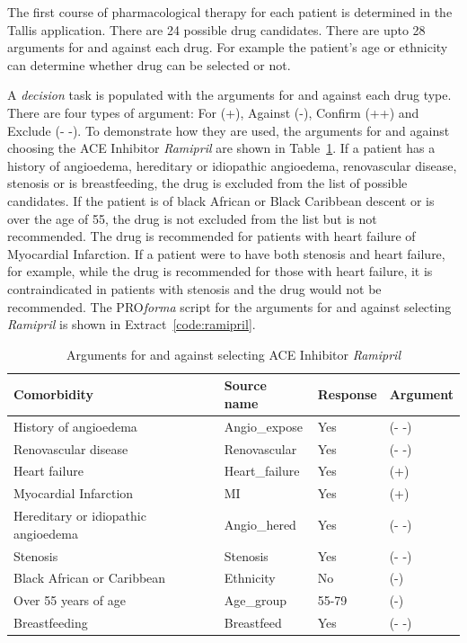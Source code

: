 \documentclass[11pt]{article}
\begin{document}
The first course of pharmacological therapy for each patient is determined in the Tallis application. There are 24 possible drug candidates. There are upto 28 arguments for and against each drug. For example the patient's age or ethnicity can determine whether drug can be selected or not.

A \textit{decision} task is populated with the arguments for and against each drug type. There are four types of argument: For (+), Against (-), Confirm (++) and Exclude (- -). To demonstrate how they are used, the arguments for and against choosing the ACE Inhibitor \textit{Ramipril} are shown in Table~\ref{table:ramipril}. If a patient has a history of angioedema, hereditary or idiopathic angioedema, renovascular disease, stenosis or is breastfeeding, the drug is excluded from the list of possible candidates. If the patient is of black African or Black Caribbean descent or is over the age of 55, the drug is not excluded from the list but is not recommended. The drug is recommended for patients with heart failure of Myocardial Infarction. If a patient were to have both stenosis and heart failure, for example, while the drug is recommended for those with heart failure, it is contraindicated in patients with stenosis and the drug would not be recommended. The PRO\textit{forma} script for the arguments for and against selecting \textit{Ramipril} is shown in Extract~\ref{code:ramipril}.

\begin{table}[ht]
\begin{center}
\begin{tabular}{| l | l | l | l |}
\hline
\textbf{Comorbidity} & \textbf{Source name} & \textbf{Response} & \textbf{Argument} \\
\hline
History of angioedema & Angio\_expose & Yes & (- -) \\
\hline
Renovascular disease & Renovascular & Yes & (- -) \\
\hline
Heart failure & Heart\_failure & Yes & (+) \\
\hline
Myocardial Infarction & MI & Yes & (+) \\
\hline
Hereditary or idiopathic angioedema	& Angio\_hered & Yes & (- -) \\
\hline
Stenosis & Stenosis & Yes & (- -) \\
\hline
Black African or Caribbean & Ethnicity & No & (-) \\
\hline
Over 55 years of age & Age\_group & 55-79 & (-) \\
\hline
Breastfeeding & Breastfeed & Yes & (- -) \\
\hline

\end{tabular}
\end{center}
\caption{Arguments for and against selecting ACE Inhibitor \textit{Ramipril}}
\label{table:ramipril}
\end{table}
\end{document}
